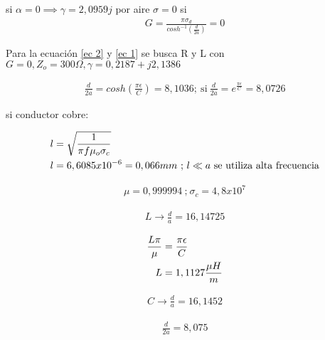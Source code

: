 si $\alpha = 0 \implies \gamma = 2,0959j$
por aire $\sigma = 0$
si 
\begin{align}
G = \frac{\pi \sigma_d}{cosh^{-1}\left(\frac{d}{2a}\right) } = 0
\end{align}

Para la ecuación \ref{ec 2} y  \ref{ec 1} se busca R y L con $G = 0, Z_o = 300 \Omega, \gamma= 0,2187 + j2,1386$

\begin{align}
    \frac{d}{2a} = cosh \left (  \frac{\pi \epsilon}{C} \right) = 8,1036 ; \ \text{si} \  \frac{d} {2a} = e^{\frac{\pi \epsilon}{C}} = 8,0726
\end{align}

si conductor cobre:

\begin{align}
    l &= \sqrt{\frac{1}{\pi f \mu_o \sigma_c}} \\
    l &= 6,6085x10^{-6} = 0,066mm \  \text{;} \  l \ll a \ \text{se utiliza alta frecuencia} \notag
\end{align}

\begin{align*}
    \mu = 0,999994 \  \text{;} \ \sigma_c = 4,8x10^7
\end{align*}

\begin{align*}
    L \to \frac{d}{a} = 16,14725
\end{align*}

\begin{align}
    \frac{L \pi}{ \mu } &= \frac{\pi \epsilon}{C} \\
    L &= 1,1127 \frac{\mu H}{m} \notag
\end{align}

\begin{align*}
    C \to \frac{d}{a} = 16,1452
\end{align*}

\begin{align*}
    \frac{d}{2a} = 8,075
\end{align*}



\pagebreak
